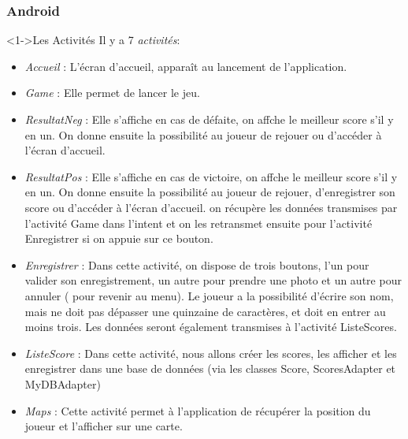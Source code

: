 \documentclass{beamer}
\begin{document}
\begin{frame}
    \frametitle<1->{Android}
     \begin{block}<1->{Les Activités}
	Il y a 7 \textit{activités}:
{\scriptsize
	\begin{itemize}
	     \item <1->\textit{Accueil} : L'écran d'accueil, apparaît au lancement de l'application. 

	     \item <2->\textit{Game} : Elle permet de lancer le jeu.

	     \item <3->\textit{ResultatNeg} : Elle s'affiche en cas de défaite, on affche le meilleur score s'il y en un. 
On donne ensuite la possibilité au joueur de rejouer ou d'accéder à l'écran d'accueil.

 	     \item <4->\textit{ResultatPos} :  Elle s'affiche en cas de victoire, on affche le meilleur score s'il y en un.
On donne ensuite la possibilité au joueur de rejouer, d'enregistrer son score ou d'accéder à l'écran d'accueil.
on récupère les données transmises par l'activité Game dans l'intent et on les retransmet ensuite pour l'activité
Enregistrer si on appuie sur ce bouton.

	     \item <5->\textit{Enregistrer} : Dans cette activité, on dispose de trois boutons, l'un pour valider son enregistrement, un autre
pour prendre une photo et un autre pour annuler ( pour revenir au menu).
Le joueur a la possibilité d'écrire son nom, mais ne doit pas dépasser une quinzaine de caractères, et doit en entrer au moins trois. 
Les données seront également transmises à l'activité ListeScores.

	     \item <6->\textit{ListeScore} : Dans cette activité, nous allons créer les scores, les afficher et les enregistrer dans une base de données (via les classes Score, ScoresAdapter et MyDBAdapter)

	     \item <7->\textit{Maps} : Cette activité permet à  l’application de récupérer la position du joueur et l’afficher sur une
carte.

	\end{itemize} 
}

     \end{block}

\end{frame}
\end{document}

